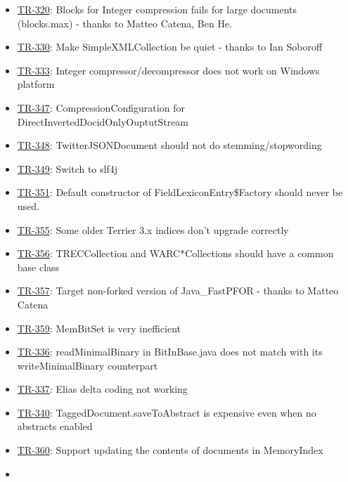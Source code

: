 \begin{itemize}
\tightlist
\item
  \href{http://terrier.org/issues/browse/TR-320}{TR-320}: Blocks for
  Integer compression fails for large documents (blocks.max) - thanks to
  Matteo Catena, Ben He.
\item
  \href{http://terrier.org/issues/browse/TR-330}{TR-330}: Make
  SimpleXMLCollection be quiet - thanks to Ian Soboroff
\item
  \href{http://terrier.org/issues/browse/TR-333}{TR-333}: Integer
  compressor/decompressor does not work on Windows platform
\item
  \href{http://terrier.org/issues/browse/TR-347}{TR-347}:
  CompressionConfiguration for DirectInvertedDocidOnlyOuptutStream
\item
  \href{http://terrier.org/issues/browse/TR-348}{TR-348}:
  TwitterJSONDocument should not do stemming/stopwording
\item
  \href{http://terrier.org/issues/browse/TR-349}{TR-349}: Switch to
  slf4j
\item
  \href{http://terrier.org/issues/browse/TR-351}{TR-351}: Default
  constructor of FieldLexiconEntry\$Factory should never be used.
\item
  \href{http://terrier.org/issues/browse/TR-355}{TR-355}: Some older
  Terrier 3.x indices don't upgrade correctly
\item
  \href{http://terrier.org/issues/browse/TR-356}{TR-356}: TRECCollection
  and WARC*Collections should have a common base class
\item
  \href{http://terrier.org/issues/browse/TR-357}{TR-357}: Target
  non-forked version of Java\_FastPFOR - thanks to Matteo Catena
\item
  \href{http://terrier.org/issues/browse/TR-359}{TR-359}: MemBitSet is
  very inefficient
\item
  \href{http://terrier.org/issues/browse/TR-336}{TR-336}:
  readMinimalBinary in BitInBase.java does not match with its
  writeMinimalBinary counterpart
\item
  \href{http://terrier.org/issues/browse/TR-337}{TR-337}: Elias delta
  coding not working
\item
  \href{http://terrier.org/issues/browse/TR-340}{TR-340}:
  TaggedDocument.saveToAbstract is expensive even when no abstracts
  enabled
\item
  \href{http://terrier.org/issues/browse/TR-360}{TR-360}: Support
  updating the contents of documents in MemoryIndex
\item

\end{itemize}
